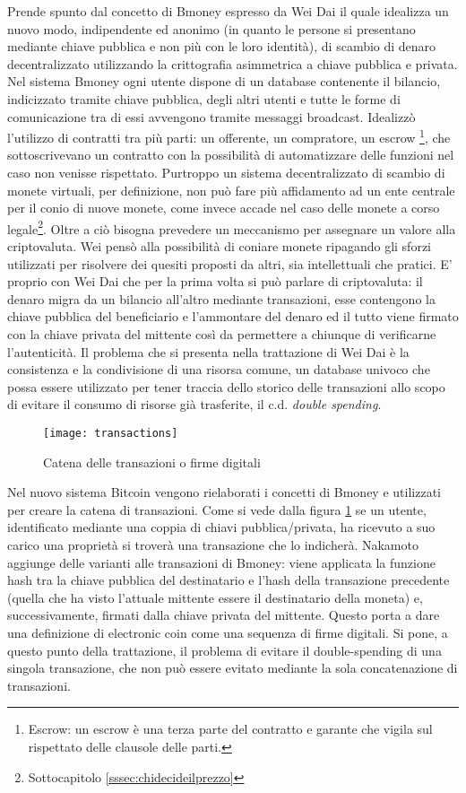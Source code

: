 	Prende spunto dal concetto di Bmoney\cite{bmoney} espresso da Wei Dai il quale idealizza un nuovo modo, indipendente ed anonimo (in quanto le persone si presentano mediante chiave pubblica e non più con le loro identità), di scambio di denaro decentralizzato utilizzando la crittografia asimmetrica a chiave pubblica e privata. 
	Nel sistema Bmoney ogni utente dispone di un database contenente il bilancio, indicizzato tramite chiave pubblica, degli altri utenti e tutte le forme di comunicazione tra di essi avvengono tramite messaggi broadcast. Idealizzò l'utilizzo di contratti tra più parti: un offerente, un compratore, un escrow \footnote{Escrow: un escrow è una terza parte del contratto e garante che vigila sul rispettato delle clausole delle parti.}, che sottoscrivevano un contratto con la possibilità di automatizzare delle funzioni nel caso non venisse rispettato. 
	Purtroppo un sistema decentralizzato di scambio di monete virtuali, per definizione, non può fare più affidamento ad un ente centrale per il conio di nuove monete, come invece accade nel caso delle monete a corso legale\footnote{Sottocapitolo \ref{sssec:chidecideilprezzo}}. Oltre a ciò bisogna prevedere un meccanismo per assegnare un valore alla criptovaluta. Wei pensò alla possibilità di coniare monete ripagando gli sforzi utilizzati per risolvere dei quesiti proposti da altri, sia intellettuali che pratici.
	E' proprio con Wei Dai che per la prima volta si può parlare di criptovaluta: il denaro migra da un bilancio all'altro mediante transazioni, esse contengono la chiave pubblica del beneficiario e l'ammontare del denaro ed il tutto viene firmato con la chiave privata del mittente così da permettere a chiunque di verificarne l'autenticità. Il problema che si presenta nella trattazione di Wei Dai è la consistenza e la condivisione di una risorsa comune, un database univoco che possa essere utilizzato per tener traccia dello storico delle transazioni allo scopo di evitare il consumo di risorse già trasferite, il c.d. \textit{double spending}. 
	
	\begin{figure}
		\caption{Catena delle transazioni o firme digitali}
		\centering
		\texttt{[image: transactions]}
		\label{fig:transactions}
	\end{figure}
	
	Nel nuovo sistema Bitcoin vengono rielaborati i concetti di Bmoney e utilizzati per creare la catena di transazioni. Come si vede dalla figura \ref{fig:transactions} se un utente, identificato mediante una coppia di chiavi pubblica/privata, ha ricevuto a suo carico una proprietà si troverà una transazione che lo indicherà. 
	Nakamoto aggiunge delle varianti alle transazioni di Bmoney: viene applicata la funzione hash tra la chiave pubblica del destinatario e l'hash della transazione precedente (quella che ha visto l'attuale mittente essere il destinatario della moneta) e, successivamente, firmati dalla chiave privata del mittente.
	Questo porta a dare una definizione di electronic coin come una sequenza di firme digitali.
	Si pone, a questo punto della trattazione, il problema di evitare il double-spending di una singola transazione, che non può essere evitato mediante la sola concatenazione di transazioni.
	
